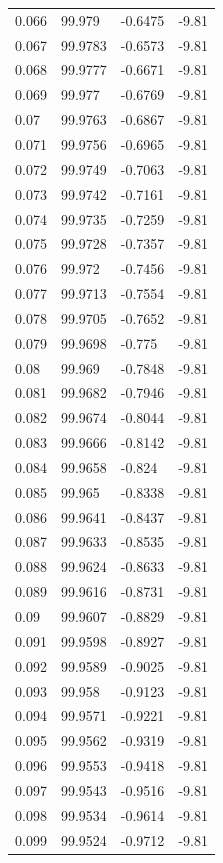 \begin{tabular}{llll}
0.066 & 99.979 & -0.6475 & -9.81 \\
0.067 & 99.9783 & -0.6573 & -9.81 \\
0.068 & 99.9777 & -0.6671 & -9.81 \\
0.069 & 99.977 & -0.6769 & -9.81 \\
0.07 & 99.9763 & -0.6867 & -9.81 \\
0.071 & 99.9756 & -0.6965 & -9.81 \\
0.072 & 99.9749 & -0.7063 & -9.81 \\
0.073 & 99.9742 & -0.7161 & -9.81 \\
0.074 & 99.9735 & -0.7259 & -9.81 \\
0.075 & 99.9728 & -0.7357 & -9.81 \\
0.076 & 99.972 & -0.7456 & -9.81 \\
0.077 & 99.9713 & -0.7554 & -9.81 \\
0.078 & 99.9705 & -0.7652 & -9.81 \\
0.079 & 99.9698 & -0.775 & -9.81 \\
0.08 & 99.969 & -0.7848 & -9.81 \\
0.081 & 99.9682 & -0.7946 & -9.81 \\
0.082 & 99.9674 & -0.8044 & -9.81 \\
0.083 & 99.9666 & -0.8142 & -9.81 \\
0.084 & 99.9658 & -0.824 & -9.81 \\
0.085 & 99.965 & -0.8338 & -9.81 \\
0.086 & 99.9641 & -0.8437 & -9.81 \\
0.087 & 99.9633 & -0.8535 & -9.81 \\
0.088 & 99.9624 & -0.8633 & -9.81 \\
0.089 & 99.9616 & -0.8731 & -9.81 \\
0.09 & 99.9607 & -0.8829 & -9.81 \\
0.091 & 99.9598 & -0.8927 & -9.81 \\
0.092 & 99.9589 & -0.9025 & -9.81 \\
0.093 & 99.958 & -0.9123 & -9.81 \\
0.094 & 99.9571 & -0.9221 & -9.81 \\
0.095 & 99.9562 & -0.9319 & -9.81 \\
0.096 & 99.9553 & -0.9418 & -9.81 \\
0.097 & 99.9543 & -0.9516 & -9.81 \\
0.098 & 99.9534 & -0.9614 & -9.81 \\
0.099 & 99.9524 & -0.9712 & -9.81 \\

\end{tabular}
